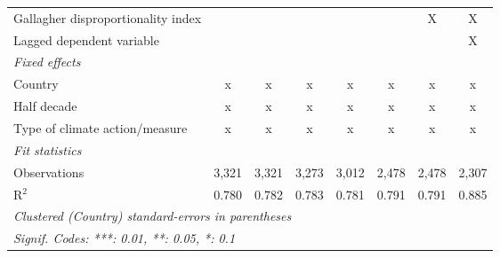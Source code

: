 \begin{tabular}{lccccccc}
   Gallagher disproportionality index                          &              &              &              &         &              & X       & X\\  
   Lagged dependent variable                                   &              &              &              &         &              &         & X\\  
   \emph{Fixed effects}\\
   Country                                                     & x            & x            & x            & x       & x            & x       & x\\  
   Half decade                                                 & x            & x            & x            & x       & x            & x       & x\\  
   Type of climate action/measure                              & x            & x            & x            & x       & x            & x       & x\\  
   \midrule \emph{Fit statistics}\\
   Observations                                                & 3,321        & 3,321        & 3,273        & 3,012   & 2,478        & 2,478   & 2,307\\  
   R$^2$                                                       & 0.780        & 0.782        & 0.783        & 0.781   & 0.791        & 0.791   & 0.885\\  
   \midrule
   \multicolumn{8}{l}{\emph{Clustered (Country) standard-errors in parentheses}}\\
   \multicolumn{8}{l}{\emph{Signif. Codes: ***: 0.01, **: 0.05, *: 0.1}}\\
\end{tabular}
\par\endgroup


